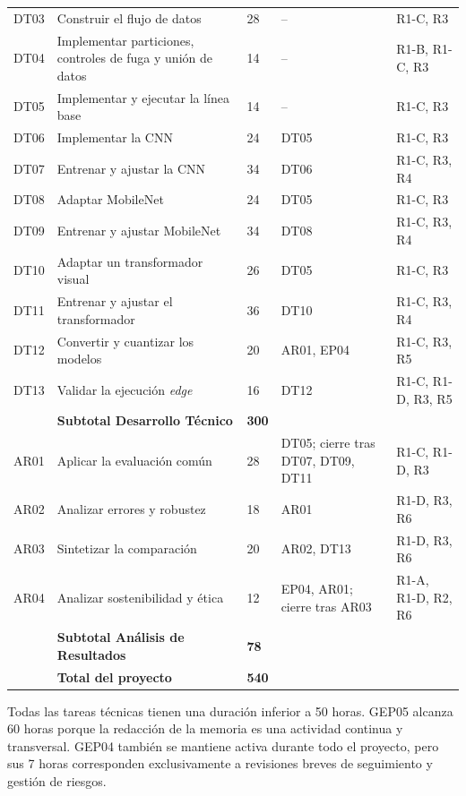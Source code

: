 \begin{longtable}{C{1.12cm}L{6.11cm}C{0.62cm}L{3.4cm}L{2.85cm}}
    DT03 & Construir el flujo de datos & 28 & -- & R1-C, R3 \\
    DT04 & Implementar particiones, controles de fuga y unión de datos & 14 & -- & R1-B, R1-C, R3 \\
    DT05 & Implementar y ejecutar la línea base & 14 & -- & R1-C, R3 \\
    DT06 & Implementar la CNN & 24 & DT05 & R1-C, R3 \\
    DT07 & Entrenar y ajustar la CNN & 34 & DT06 & R1-C, R3, R4 \\
    DT08 & Adaptar MobileNet & 24 & DT05 & R1-C, R3 \\
    DT09 & Entrenar y ajustar MobileNet & 34 & DT08 & R1-C, R3, R4 \\
    DT10 & Adaptar un transformador visual & 26 & DT05 & R1-C, R3 \\
    DT11 & Entrenar y ajustar el transformador & 36 & DT10 & R1-C, R3, R4 \\
    DT12 & Convertir y cuantizar los modelos & 20 & AR01, EP04 & R1-C, R3, R5 \\
    DT13 & Validar la ejecución \emph{edge} & 16 & DT12 & R1-C, R1-D, R3, R5 \\
    \midrule
    & \textbf{Subtotal Desarrollo Técnico} & \textbf{300} & & \\
    \midrule
    AR01 & Aplicar la evaluación común & 28 & DT05; cierre tras DT07, DT09, DT11 & R1-C, R1-D, R3 \\
    AR02 & Analizar errores y robustez & 18 & AR01 & R1-D, R3, R6 \\
    AR03 & Sintetizar la comparación & 20 & AR02, DT13 & R1-D, R3, R6 \\
    AR04 & Analizar sostenibilidad y ética & 12 & EP04, AR01; cierre tras AR03 & R1-A, R1-D, R2, R6 \\
    \midrule
    & \textbf{Subtotal Análisis de Resultados} & \textbf{78} & & \\
    \midrule
    & \textbf{Total del proyecto} & \textbf{540} & & \\
  \end{longtable}
\endgroup



Todas las tareas técnicas tienen una duración inferior a 50 horas. GEP05
alcanza 60 horas porque la redacción de la memoria es una actividad continua y
transversal. GEP04 también se mantiene activa durante todo el proyecto, pero
sus 7 horas corresponden exclusivamente a revisiones breves de seguimiento y
gestión de riesgos.

